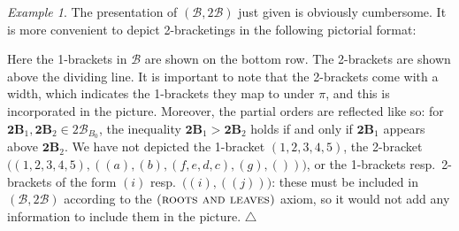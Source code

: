 \documentclass[11pt]{amsart}
\theoremstyle{definition}
\theoremstyle{remark}
\newtheorem{example}[theorem]{Example}
\theoremstyle{plain}
\newcommand{\btB}{{\mathbf{2B}}}
\newcommand{\sB}{\mathscr{B}}
\newcommand{\stB}{2\mathscr{B}}
\begin{document}
\begin{example}
The presentation of $(\sB,\stB)$ just given is obviously cumbersome.
It is more convenient to depict 2-bracketings in the following pictorial format:
\begin{figure}[H]
\centering
\def\svgwidth{0.15\columnwidth}

\label{fig:2-bracketing_example}
\end{figure}
\noindent Here the 1-brackets in $\sB$ are shown on the bottom row.
The 2-brackets are shown above the dividing line.
It is important to note that the 2-brackets come with a width, which indicates the 1-brackets they map to under $\pi$, and this is incorporated in the picture.
Moreover, the partial orders are reflected like so: for $\btB_1, \btB_2 \in \stB_{B_0}$, the inequality $\btB_1>\btB_2$ holds if and only if $\btB_1$ appears above $\btB_2$.
We have not depicted the 1-bracket $(1,2,3,4,5)$, the 2-bracket $\bigl((1,2,3,4,5),((a),(b),(f,e,d,c),(g),())\bigr)$, or the 1-brackets resp.\ 2-brackets of the form $(i)$ resp.\ $\bigl((i),((j))\bigr)$: these must be included in $(\sB,\stB)$ according to the $\textsc{(roots and leaves)}$ axiom, so it would not add any information to include them in the picture.
\null\hfill$\triangle$
\end{example}
\end{document}
